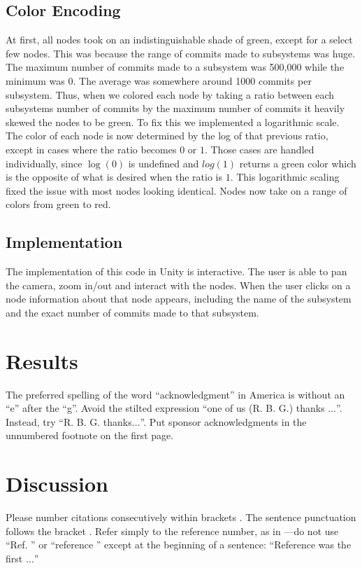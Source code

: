 \documentclass[conference]{IEEEtran}
\begin{document}
\subsection{Color Encoding}
At first, all nodes took on an indistinguishable shade of green, except for a select few nodes. This was because the range of commits made to subsystems was huge. The maximum number of commits made to a subsystem was 500,000 while the minimum was 0. The average was somewhere around 1000 commits per subsystem. Thus, when we colored each node by taking a ratio between each subsystems number of commits by the maximum number of commits it heavily skewed the nodes to be green. To fix this we implemented a logarithmic scale. The color of each node is now determined by the log of that previous ratio, except in cases where the ratio becomes $0$ or $1$. Those cases are handled individually, since $\log(0)$ is undefined and $log(1)$ returns a green color which is the opposite of what is desired when the ratio is $1$. This logarithmic scaling fixed the issue with most nodes looking identical. Nodes now take on a range of colors from green to red.

\subsection{Implementation}
The implementation of this code in Unity is interactive. The user is able to pan the camera, zoom in/out and interact with the nodes. When the user clicks on a node information about that node appears, including the name of the subsystem and the exact number of commits made to that subsystem.

\section{Results}

The preferred spelling of the word ``acknowledgment'' in America is without 
an ``e'' after the ``g''. Avoid the stilted expression ``one of us (R. B. 
G.) thanks $\ldots$''. Instead, try ``R. B. G. thanks$\ldots$''. Put sponsor 
acknowledgments in the unnumbered footnote on the first page.

\section{Discussion}

Please number citations consecutively within brackets \cite{b1}. The 
sentence punctuation follows the bracket \cite{b2}. Refer simply to the reference 
number, as in \cite{b3}---do not use ``Ref. \cite{b3}'' or ``reference \cite{b3}'' except at 
the beginning of a sentence: ``Reference \cite{b3} was the first $\ldots$''
\end{document}
